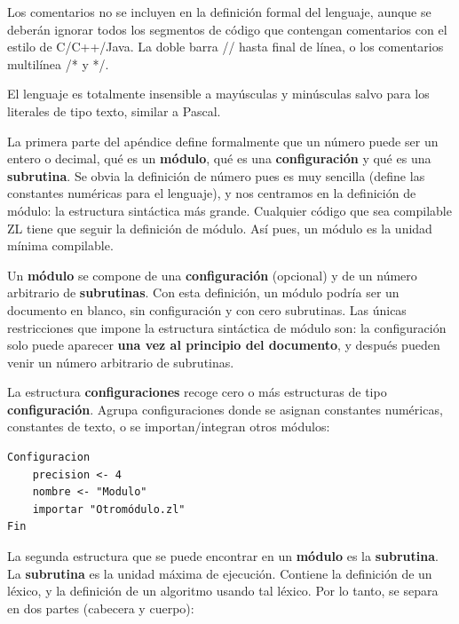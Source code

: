 \documentclass{report}
\begin{document}
	\vspace{10px}
	
	Los comentarios no se incluyen en la definición formal del lenguaje, aunque se deberán ignorar todos los segmentos de código que contengan comentarios con el estilo de C/C++/Java. La doble barra // hasta final de línea, o los comentarios multilínea /* y */.
	
	\vspace{10px}
	
	El lenguaje es totalmente insensible a mayúsculas y minúsculas salvo para los literales de tipo texto, similar a Pascal. 
	
	\vspace{10px}
	
	La primera parte del apéndice define formalmente que un número puede ser un entero o decimal, qué es un \textbf{módulo}, qué es una \textbf{configuración} y qué es una \textbf{subrutina}. Se obvia la definición de número pues es muy sencilla (define las constantes numéricas para el lenguaje), y nos centramos en la definición de módulo: la estructura sintáctica más grande. Cualquier código que sea compilable ZL tiene que seguir la definición de módulo. Así pues, un módulo es la unidad mínima compilable.   
	
	\vspace{10px}
	
	Un \textbf{módulo} se compone de una \textbf{configuración} (opcional) y de un número arbitrario de \textbf{subrutinas}. Con esta definición, un módulo podría ser un documento en blanco, sin configuración y con cero subrutinas. Las únicas restricciones que impone la estructura sintáctica de módulo son: la configuración solo puede aparecer \textbf{una vez al principio del documento}, y después pueden venir un número arbitrario de subrutinas. 
	
	\vspace{10px}
	
	La estructura \textbf{configuraciones} recoge cero o más estructuras de tipo \textbf{configuración}. Agrupa configuraciones donde se asignan constantes numéricas, constantes de texto, o se importan/integran otros módulos:
	
	\vspace{10px}
	
\begin{BVerbatim}
Configuracion
	precision <- 4
	nombre <- "Modulo"
	importar "Otromódulo.zl"
Fin
\end{BVerbatim}
	
	La segunda estructura que se puede encontrar en un \textbf{módulo} es la \textbf{subrutina}. La \textbf{subrutina} es la unidad máxima de ejecución. Contiene la definición de un léxico, y la definición de un algoritmo usando tal léxico. Por lo tanto, se separa en dos partes (cabecera y cuerpo):
	
\end{document}
